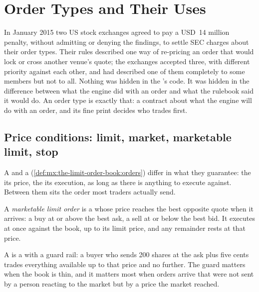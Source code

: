 \chapter{Order Types and Their Uses}\label{ch:mx:order-types-and-their-uses}

In January 2015 two US stock exchanges agreed to pay a USD~14 million penalty, without admitting or denying the findings, to settle SEC charges
about their order types. Their rules described one way of re-pricing an order that would lock or cross another venue's quote; the exchanges
accepted three, with different priority against each other, and had described one of them completely to some members but not to all. Nothing was
hidden in the 's code. It was hidden in the difference between what the engine did with an order and what the rulebook said it
would do. An order type is exactly that: a contract about what the engine will do with an order, and its fine print decides who trades first.

\section{Price conditions: limit, market, marketable limit, stop}

A  and a  (\cref{def:mx:the-limit-order-book:orders}) differ in what they guarantee: the  its price, the  its execution, as long as there is anything to execute against. Between them sits the order most traders actually send.

\begin{definition}\label{def:mx:order-types-and-their-uses:marketable}
A \emph{marketable limit order} is a  whose price reaches the best opposite quote when it arrives: a buy at or
above the best ask, a sell at or below the best bid. It executes at once against the book, up to its limit price, and any remainder rests at that price.
\end{definition}

A  is a  with a guard rail: a buyer who sends 200 shares at the ask plus five cents trades everything available up
to that price and no further. The guard matters when the book is thin, and it matters most when orders arrive that were not sent by a person
reacting to the market but by a price the market reached.

